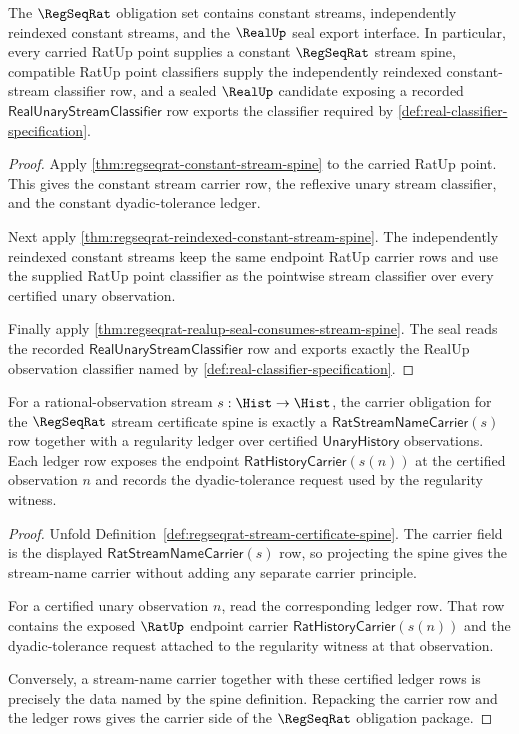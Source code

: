 \begin{theorem}
\label{thm:regseqrat-obligation-seal-ledger}
The $\RegSeqRat$ obligation set contains constant streams, independently
reindexed constant streams, and the $\RealUp$ seal export interface. In
particular, every carried RatUp point supplies a constant $\RegSeqRat$ stream
spine, compatible RatUp point classifiers supply the independently reindexed
constant-stream classifier row, and a sealed $\RealUp$ candidate exposing a
recorded $\mathsf{RealUnaryStreamClassifier}$ row exports the classifier
required by \autoref{def:real-classifier-specification}.
\end{theorem}
\begin{proof}
Apply \autoref{thm:regseqrat-constant-stream-spine} to the carried RatUp point.
This gives the constant stream carrier row, the reflexive unary stream
classifier, and the constant dyadic-tolerance ledger.

Next apply \autoref{thm:regseqrat-reindexed-constant-stream-spine}. The
independently reindexed constant streams keep the same endpoint RatUp carrier
rows and use the supplied RatUp point classifier as the pointwise stream
classifier over every certified unary observation.

Finally apply \autoref{thm:regseqrat-realup-seal-consumes-stream-spine}. The
seal reads the recorded $\mathsf{RealUnaryStreamClassifier}$ row and exports
exactly the RealUp observation classifier named by
\autoref{def:real-classifier-specification}.
\end{proof}

\begin{theorem}
\label{thm:regseqrat-carrier-obligation-package}
For a rational-observation stream $s:\Hist\to\Hist$, the carrier obligation
for the $\RegSeqRat$ stream certificate spine is exactly a
$\mathsf{RatStreamNameCarrier}(s)$ row together with a regularity ledger over
certified $\mathsf{UnaryHistory}$ observations. Each ledger row exposes the
endpoint $\mathsf{RatHistoryCarrier}(s(n))$ at the certified observation $n$
and records the dyadic-tolerance request used by the regularity witness.
\end{theorem}
\begin{proof}
Unfold Definition~\ref{def:regseqrat-stream-certificate-spine}. The carrier
field is the displayed $\mathsf{RatStreamNameCarrier}(s)$ row, so projecting
the spine gives the stream-name carrier without adding any separate carrier
principle.

For a certified unary observation $n$, read the corresponding ledger row. That
row contains the exposed $\RatUp$ endpoint carrier
$\mathsf{RatHistoryCarrier}(s(n))$ and the dyadic-tolerance request attached to
the regularity witness at that observation.

Conversely, a stream-name carrier together with these certified ledger rows is
precisely the data named by the spine definition. Repacking the carrier row and
the ledger rows gives the carrier side of the $\RegSeqRat$ obligation package.
\end{proof}

